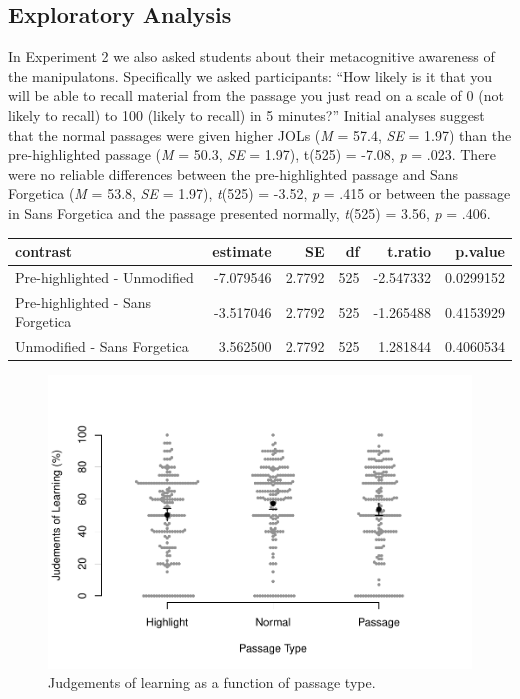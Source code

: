 \documentclass[english,doc]{apa6}
\begin{document}
\hypertarget{exploratory-analysis}{%
\subsection{Exploratory Analysis}\label{exploratory-analysis}}

In Experiment 2 we also asked students about their metacognitive awareness of the manipulatons. Specifically we asked participants: \enquote{How likely is it that you will be able to recall material from the passage you just read on a scale of 0 (not likely to recall) to 100 (likely to recall) in 5 minutes?} Initial analyses suggest that the normal passages were given higher JOLs (\emph{M} = 57.4, \emph{SE} = 1.97) than the pre-highlighted passage (\emph{M} = 50.3, \emph{SE} = 1.97), t(525) = -7.08, \emph{p} = .023. There were no reliable differences between the pre-highlighted passage and Sans Forgetica (\emph{M} = 53.8, \emph{SE} = 1.97), \emph{t}(525) = -3.52, \emph{p} = .415 or between the passage in Sans Forgetica and the passage presented normally, \emph{t}(525) = 3.56, \emph{p} = .406.

\begin{tabular}{l|r|r|r|r|r}
\hline
contrast & estimate & SE & df & t.ratio & p.value\\
\hline
Pre-highlighted - Unmodified & -7.079546 & 2.7792 & 525 & -2.547332 & 0.0299152\\
\hline
Pre-highlighted - Sans Forgetica & -3.517046 & 2.7792 & 525 & -1.265488 & 0.4153929\\
\hline
Unmodified - Sans Forgetica & 3.562500 & 2.7792 & 525 & 1.281844 & 0.4060534\\
\hline
\end{tabular}

\begin{figure}

{\centering \includegraphics{SF_Paper_files/figure-latex/unnamed-chunk-4-1} 

}

\caption{Judgements of learning as a function of passage type.}\label{fig:unnamed-chunk-4}
\end{figure}
\end{document}
